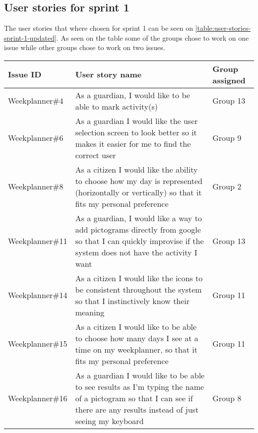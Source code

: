 \subsection{User stories for sprint 1}
The user stories that where chosen for sprint 1 can be seen on \autoref{table:user-stories-sprint-1-updated}. As seen on the table some of the groups chose to work on one issue while other groups chose to work on two issues.

\begin{table}[H]
    \begin{tabular}{|p{2.8cm}|p{8cm}|p{2cm}|}
    \hline
    Issue ID        & User story name                                                                                                                                                          & Group assigned       \\ \hline
    Weekplanner\#4  & As a guardian, I would like to be able to mark activity(s)                                                                                                               & Group 13             \\ \hline
    Weekplanner\#6  & As a guardian I would like the user selection screen to look better so it makes it easier for me to find the correct user                                                & Group 9              \\ \hline
    Weekplanner\#8  & As a citizen I would like the ability to choose how my day is represented (horizontally or vertically) so that it fits my personal preference                            & Group 2              \\ \hline
    Weekplanner\#11 & As a guardian, I would like a way to add pictograms directly from google so that I can quickly improvise if the system does not have the activity I want                 & Group 13             \\ \hline
    Weekplanner\#14 & As a citizen I would like the icons to be consistent throughout the system so that I instinctively know their meaning                                                    & Group 11             \\ \hline
    Weekplanner\#15 & As a citizen I would like to be able to choose how many days I see at a time on my weekplanner, so that it fits my personal preference                                   & Group 11             \\ \hline
    Weekplanner\#16 & As a guardian I would like to be able to see results as I'm typing the name of a pictogram so that I can see if there are any results instead of just seeing my keyboard & Group 8              \\ \hline

\end{tabular}
\end{table}
